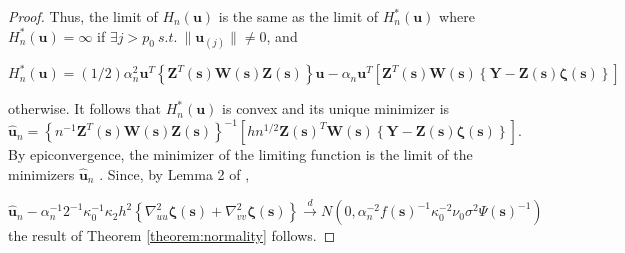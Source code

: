 \documentclass[12pt,english,authoryear, review]{article}\usepackage[]{graphicx}\usepackage[]{color}
\theoremstyle{plain}
\theoremstyle{plain}
\begin{document}
\begin{proof}
Thus, the limit of $H_{n}\left(\bm{u}\right)$ is the same as the
limit of $H_{n}^{*}\left(\bm{u}\right)$ where $H_{n}^{*}\left(\bm{u}\right)=\infty$
if $\exists j>p_{0}\ s.t.\ \|\bm{u}_{\left(j\right)}\|\ne0$, and 

\[
H_{n}^{*}\left(\bm{u}\right)=(1/2)\alpha_{n}^{2}\bm{u}^{T}\left\{ \bm{Z}^{T}(\bm{s})\bm{W}(\bm{s})\bm{Z}(\bm{s})\right\} \bm{u}-\alpha_{n}\bm{u}^{T}\left[\bm{Z}^{T}(\bm{s})\bm{W}(\bm{s})\left\{ \bm{Y}-\bm{Z}(\bm{s})\bm{\zeta}(\bm{s})\right\} \right]
\]


otherwise. It follows that $H_{n}^{*}\left(\bm{u}\right)$ is convex
and its unique minimizer is 
\[
\hat{\bm{u}}_{n}=\left\{ n^{-1}\bm{Z}^{T}\left(\bm{s}\right)\bm{W}\left(\bm{s}\right)\bm{Z}\left(\bm{s}\right)\right\} ^{-1}\left[hn^{1/2}\bm{Z}\left(\bm{s}\right)^{T}\bm{W}\left(\bm{s}\right)\left\{ \bm{Y}-\bm{Z}\left(\bm{s}\right)\bm{\zeta}\left(\bm{s}\right)\right\} \right].
\]
By epiconvergence, the minimizer of the limiting function is the limit
of the minimizers $\hat{\bm{u}}_{n}$ \citep{Geyer-1994,Knight-Fu-2000}.
Since, by Lemma 2 of \citet{Sun-Yan-Zhang-Lu-2014},

\[
\hat{\bm{u}}_{n}-\alpha_{n}^{-1}2^{-1}\kappa_{0}^{-1}\kappa_{2}h^{2}\left\{ \nabla_{uu}^{2}\bm{\zeta}(\bm{s})+\nabla_{vv}^{2}\bm{\zeta}(\bm{s})\right\} \xrightarrow{d}N\left(0,\alpha_{n}^{-2}f\left(\bm{s}\right)^{-1}\kappa_{0}^{-2}\nu_{0}\sigma^{2}\Psi\left(\bm{s}\right)^{-1}\right)
\]
the result of Theorem \ref{theorem:normality} follows.
\end{proof}
\end{document}
